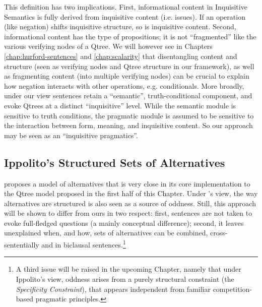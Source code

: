 \begin{exe}
	\label{ex2:inf-content}
\end{exe}

This definition has two implications. First, informational content in Inquisitive Semantics is fully derived from inquisitive content (i.e. issues). If an operation (like negation) shifts inquisitive structure, so is inquisitive content. Second, informational content has the type of propositions; it is not ``fragmented'' like the various verifying nodes of a Qtree. We will however see in Chapters \ref{chap:hurford-sentences} and \ref{chap:scalarity} that disentangling content and structure (seen as verifying nodes and Qtree structure in our framework), as well as fragmenting content (into multiple verifying nodes) can be crucial to explain how negation interacts with other operations, e.g. conditionals. More broadly, under our view sentences retain a ``semantic'', truth-conditional component, and evoke Qtrees at a distinct ``inquisitive'' level. While the semantic module is sensitive to truth conditions, the pragmatic module is assumed to be sensitive to the interaction between form, meaning, and inquisitive content. So our approach may be seen as an ``inquisitive pragmatics''. 



\subsection{Ippolito's Structured Sets of Alternatives}

\textcite{Ippolito2019} proposes a model of alternatives that is very close in its core implementation to the Qtree model proposed in the first half of this Chapter. Under \citeauthor{Ippolito2019}'s view, the way alternatives are structured is also seen as a source of oddness. Still, this approach will be shown to differ from ours in two respect: first, sentences are not taken to evoke full-fledged questions (a mainly conceptual difference); second, it leaves unexplained when, and how, sets of alternatives can be combined, cross-sententially and in biclausal sentences.\footnote{A third issue will be raised in the upcoming Chapter, namely that under Ippolito's view, oddness arises from a purely structural constraint (the \textit{Specificity Constraint}), that appears independent from familiar competition-based pragmatic principles.} \\


